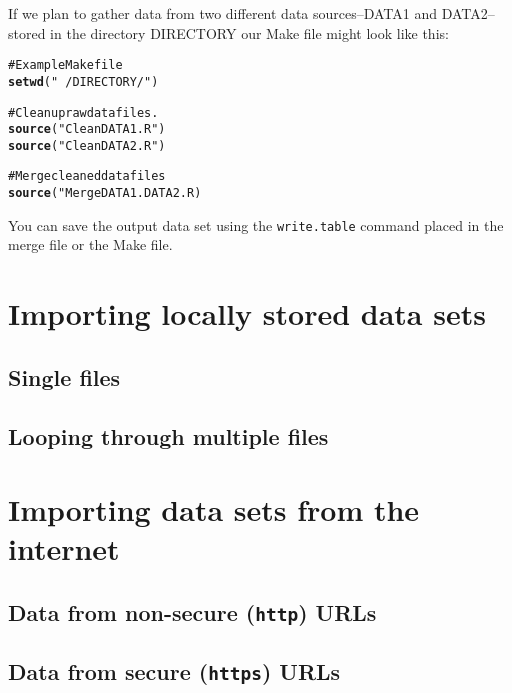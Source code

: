 \documentclass[ChapterTOCs,krantz1]{krantz}\usepackage{graphicx, color}
\makeatletter
\newcommand{\hlfunctioncall}[1]{\textcolor[rgb]{0.501960784313725,0,0.329411764705882}{\textbf{#1}}}%
\newcommand{\hlstring}[1]{\textcolor[rgb]{0.6,0.6,1}{#1}}%
\newcommand{\hlcomment}[1]{\textcolor[rgb]{0.180392156862745,0.6,0.341176470588235}{#1}}%
\newenvironment{kframe}{%
 \def\at@end@of@kframe{}%
 \ifinner\ifhmode%
  \def\at@end@of@kframe{\end{minipage}}%
  \begin{minipage}{\columnwidth}%
 \fi\fi%
 \def\FrameCommand##1{\hskip\@totalleftmargin \hskip-\fboxsep
 \colorbox{shadecolor}{##1}\hskip-\fboxsep
     \hskip-\linewidth \hskip-\@totalleftmargin \hskip\columnwidth}%
 \MakeFramed {\advance\hsize-\width
   \@totalleftmargin\z@ \linewidth\hsize
   \@setminipage}}%
 {\par\unskip\endMakeFramed%
 \at@end@of@kframe}
\newenvironment{knitrout}{}{} %
\makeatother
\begin{document}
If we plan to gather data from two different data sources--DATA1 and DATA2--stored in the directory DIRECTORY our Make file might look like this:

\begin{knitrout}
\color{fgcolor}\begin{kframe}
\begin{alltt}
\hlcomment{# Example Make file}
\hlfunctioncall{setwd}(\hlstring{"~/DIRECTORY/"})

\hlcomment{# Clean up raw data files.}
\hlfunctioncall{source}(\hlstring{"CleanDATA1.R"})
\hlfunctioncall{source}(\hlstring{"CleanDATA2.R"})
    
\hlcomment{# Merge cleaned data files}
\hlfunctioncall{source}("MergeDATA1.DATA2.R)
\end{alltt}
\end{kframe}
\end{knitrout}


You can save the output data set using the {\tt{write.table}} command placed in the merge file or the Make file.

\section{Importing locally stored data sets}

\subsection{Single files}

\subsection{Looping through multiple files}

\section{Importing data sets from the internet}

\subsection{Data from non-secure ({\tt{http}}) URLs}

\subsection{Data from secure ({\tt{https}}) URLs}
\end{document}
